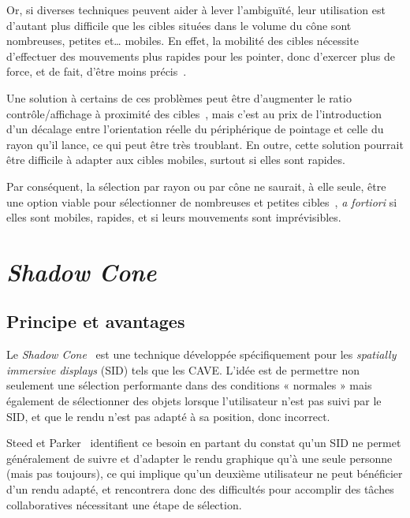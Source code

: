 	Or, si diverses techniques peuvent aider à lever l'ambiguïté, leur utilisation est d'autant plus difficile que les cibles situées dans le volume du cône sont nombreuses, petites et\ldots{} mobiles. En effet, la mobilité des cibles nécessite d'effectuer des mouvements plus rapides pour les pointer, donc d'exercer plus de force, et de fait, d'être moins précis~\cite{schmidt1979motor}.
	
	Une solution à certains de ces problèmes peut être d'augmenter le ratio contrôle/affichage à proximité des cibles~\cite{frees2007prism, kopper2010human}, mais c'est au prix de l'introduction d'un décalage entre l'orientation réelle du périphérique de pointage et celle du rayon qu'il lance, ce qui peut être très troublant. En outre, cette solution pourrait être difficile à adapter aux cibles mobiles, surtout si elles sont rapides.
	
	Par conséquent, la sélection par rayon ou par cône ne saurait, à elle seule, être une option viable pour sélectionner de nombreuses et petites cibles~\cite{steed20043d}, \emph{a fortiori} si elles sont mobiles, rapides, et si leurs mouvements sont imprévisibles.
	
\section{\emph{Shadow Cone}}
	\subsection{Principe et avantages}
	Le \emph{Shadow Cone}~\cite{steed20043d} est une technique développée spécifiquement pour les \emph{spatially immersive displays} (SID) tels que les CAVE. L'idée est de permettre non seulement une sélection performante dans des conditions « normales » mais également de sélectionner des objets lorsque l'utilisateur n'est pas suivi par le SID, et que le rendu n'est pas adapté à sa position, donc incorrect.
	
	Steed et Parker~\cite{steed20043d} identifient ce besoin en partant du constat qu'un SID ne permet généralement de suivre et d'adapter le rendu graphique qu'à une seule personne (mais pas toujours\footnotemark), ce qui implique qu'un deuxième utilisateur ne peut bénéficier d'un rendu adapté, et rencontrera donc des difficultés pour accomplir des tâches collaboratives nécessitant une étape de sélection.
	
	
